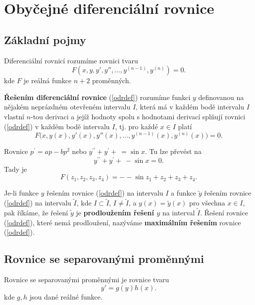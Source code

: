 \section{Obyčejné diferenciální rovnice}
\subsection{Základní pojmy}

\begin{definice}
Diferenciální rovnicí rozumíme rovnici tvaru
\begin{equation}\label{odrdef}
F(x,y,y',y'',\ldots,y^{(n-1)},y^{(n)})=0.
\end{equation}
kde $F$ je reálná funkce $n+2$ proměnných.

\textbf{Řešením diferenciální rovnice} (\ref{odrdef}) rozumíme funkci $y$ definovanou na nějakém neprázdném
otevřeném intervalu $I$, která má v každém bodě intervalu $I$ vlastní $n$-tou derivaci a jejíž hodnoty
spolu s hodnotami derivací splňují rovnici (\ref{odrdef}) v každém bodě intervalu $I$, tj. pro každé $x\in I$
platí
\[
F\bigl(x,y(x),y'(x),y''(x),\ldots,y^{(n-1)}(x),y^{(n)}(x)\bigr)=0.
\]
\end{definice}

\begin{priklad}
	Rovnice $p^\prime = ap - bp^2$ nebo $y^{\prime\prime} +y^\prime +\ = \sin x$. Tu lze převést na
$$y^{\prime\prime} +y^\prime +\ -\sin x= 0.$$
Tady je
	$$F(z_1,z_2,z_3,z_4)=--\sin z_1 + z_2 + z_3 + z_4.$$
\end{priklad}

\begin{definice}
Je-li funkce $y$ řešením rovnice (\ref{odrdef}) na intervalu $I$ a funkce $\widetilde y$ řešením rovnice (\ref{odrdef}) na
intervalu $\widetilde I$, kde $I\subset\widetilde I$, $I\ne\widetilde I$, a $y(x)=\widetilde y(x)$ pro všechna $x\in I$,
pak říkáme, že řešení $\widetilde y$ je \textbf{prodloužením řešení $y$} na interval $\widetilde I$.
Řešení rovnice (\ref{odrdef}), které nemá prodloužení, nazýváme \textbf{maximálním řešením} rovnice (\ref{odrdef}).
\end{definice}

\subsection{Rovnice se separovanými proměnnými}
\begin{definice}
Rovnice se separovanými proměnnými je rovnice tvaru
\begin{equation}\label{separ}
y'=g(y)h(x).
\end{equation}
kde $g,h$ jsou dané reálné funkce.
\end{definice}

